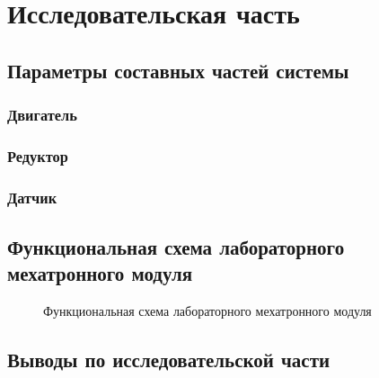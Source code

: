 \newpage
\section{Исследовательская часть}






\newpage
\subsection{Параметры составных частей системы}

\subsubsection{Двигатель}

\subsubsection{Редуктор}

\subsubsection{Датчик}

\subsection{Функциональная схема лабораторного мехатронного модуля}
\begin{figure}[h!]
    \centering
    \caption{Функциональная схема лабораторного мехатронного модуля}
    \label{stand_functional_scheme}
\end{figure}

\newpage


\newpage


\newpage
\subsection{Выводы по исследовательской части}
